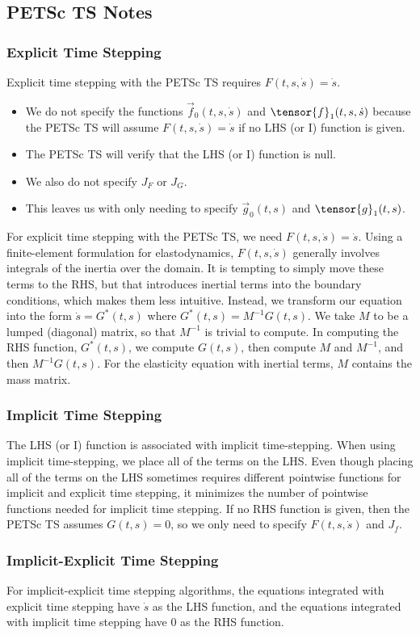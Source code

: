 \subsection{PETSc TS Notes}

\subsubsection{Explicit Time Stepping}

Explicit time stepping with the PETSc TS requires
$F(t,s,\dot{s}) = \dot{s}$.
\begin{itemize}
\item We do not specify the functions $\vec{f}_0(t,s,\dot{s})$ and
  $\tensor{f}_1(t,s,\dot{s})$ because the PETSc TS will assume
  $F(t,s,\dot{s}) = \dot{s}$ if no LHS (or I) function is given.
\item The PETSc TS will verify that the LHS (or I) function is null.
\item We also do not specify $J_F$ or $J_G$.
\item This leaves us with only needing to specify $\vec{g}_0(t,s)$
  and $\tensor{g}_1(t,s)$. 
\end{itemize}

For explicit time stepping with the PETSc TS, we need
$F(t,s,\dot{s}) = \dot{s}$. Using a finite-element formulation for
elastodynamics, $F(t,s,\dot{s})$ generally involves integrals of the
inertia over the domain. It is tempting to simply move these terms to
the RHS, but that introduces inertial terms into the boundary
conditions, which makes them less intuitive. Instead, we transform our
equation into the form $\dot{s} = G^*(t,s)$ where
$G^*(t,s) = M^{-1} G(t,s)$. We take $M$ to be a lumped (diagonal)
matrix, so that $M^{-1}$ is trivial to compute. In computing the RHS
function, $G^*(t,s)$, we compute $G(t,s)$, then compute $M$ and
$M^{-1}$, and then $M^{-1}G(t,s)$. For the elasticity equation with
inertial terms, $M$ contains the mass matrix.

\subsubsection{Implicit Time Stepping}

The LHS (or I) function is associated with implicit time-stepping.
When using implicit time-stepping, we place all of the terms on the
LHS. Even though placing all of the terms on the LHS sometimes
requires different pointwise functions for implicit and explicit time
stepping, it minimizes the number of pointwise functions needed for
implicit time stepping.  If no RHS function is given, then the PETSc
TS assumes $G(t,s) = 0$, so we only need to specify $F(t,s,\dot{s})$
and $J_f$.

\subsubsection{Implicit-Explicit Time Stepping}

For implicit-explicit time stepping algorithms, the equations
integrated with explicit time stepping have $\dot{s}$ as the LHS
function, and the equations integrated with implicit time stepping
have 0 as the RHS function.

